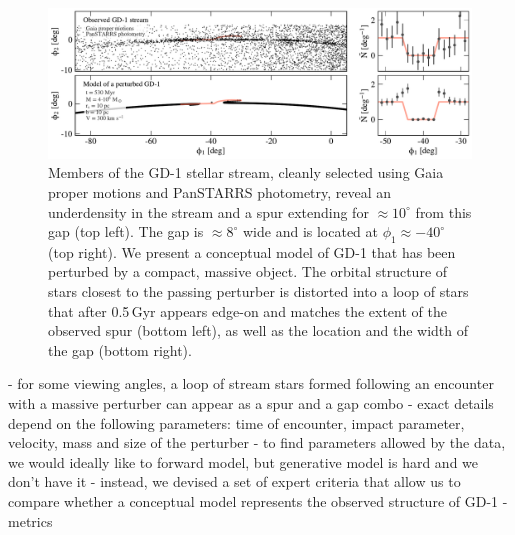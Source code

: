 \documentclass[12pt, modern]{aastex62}
\begin{document}
\begin{figure}
\begin{center}
\includegraphics[width=\textwidth]{data_model_comparison.pdf}
\end{center}
\caption{Members of the GD-1 stellar stream, cleanly selected using Gaia proper motions and PanSTARRS photometry, reveal an underdensity in the stream and a spur extending for $\approx10^\circ$ from this gap (top left).
The gap is $\approx8^\circ$ wide and is located at $\phi_1\approx-40^\circ$ (top right).
We present a conceptual model of GD-1 that has been perturbed by a compact, massive object.
The orbital structure of stars closest to the passing perturber is distorted into a loop of stars that after 0.5\,Gyr appears edge-on and matches the extent of the observed spur (bottom left), as well as the location and the width of the gap (bottom right).
}
\label{fig:model}
\end{figure}

- for some viewing angles, a loop of stream stars formed following an encounter with a massive perturber can appear as a spur and a gap combo
- exact details depend on the following parameters: time of encounter, impact parameter, velocity, mass and size of the perturber
- to find parameters allowed by the data, we would ideally like to forward model, but generative model is hard and we don't have it
- instead, we devised a set of expert criteria that allow us to compare whether a conceptual model represents the observed structure of GD-1
- metrics
\end{document}
